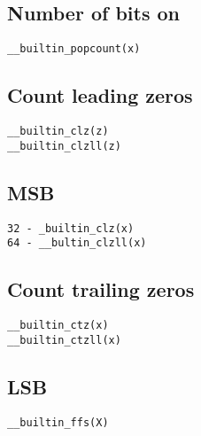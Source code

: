 \subsection{Number of bits on}
\begin{lstlisting}[style=c++, numbers=none]
__builtin_popcount(x)
\end{lstlisting}
\subsection{Count leading zeros}
\begin{lstlisting}[style=c++, numbers=none]
__builtin_clz(z)
__builtin_clzll(z)
\end{lstlisting}
\subsection{MSB}
\begin{lstlisting}[style=c++, numbers=none]
32 - _builtin_clz(x)
64 - __bultin_clzll(x)
\end{lstlisting}
\subsection{Count trailing zeros}
\begin{lstlisting}[style=c++, numbers=none]
__builtin_ctz(x)
__builtin_ctzll(x)
\end{lstlisting}
\subsection{LSB}
\begin{lstlisting}[style=c++, numbers=none]
__builtin_ffs(X)
\end{lstlisting}